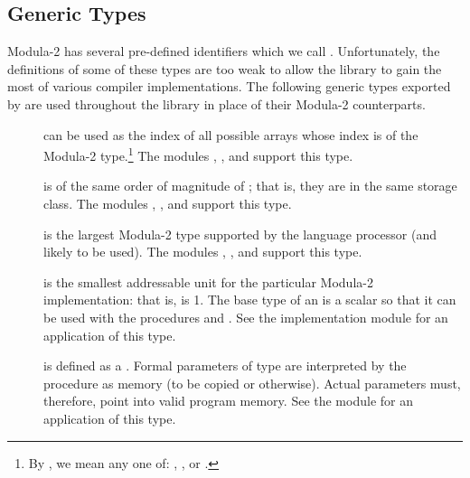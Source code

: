 \subsection{Generic Types}
Modula-2 has several pre-defined identifiers which we call
.  Unfortunately, the definitions of some
of these types are too weak to allow the library to gain the most
of various compiler implementations.
The following generic types exported by 
are used throughout the library in place of their Modula-2 counterparts.
\begin{description}
\item[]
    can be used as the index of all possible arrays whose index
    is of the  Modula-2 type.\footnote{
    	By , we mean any one of:
	, , or .
    }
    The modules , ,
    and  support this type.
\item[]
    is of the same order of magnitude of ; that is,
    they are in the same storage class.
    The modules , ,
    and  support this type.

\item[]
    is the largest Modula-2  type supported by
    the language processor (and likely to be used).
    The modules , ,
    and  support this type.
    
\item[]
    is the smallest addressable unit for the particular Modula-2
    implementation: that is, 
    is 1.  The base type of an
     is a scalar so that it can be used with
    the procedures  and .
    See the implementation module  for an
    application of this type.

\item[]
    is defined as a .
    Formal parameters of type  are interpreted
    by the procedure as memory (to be copied or otherwise).
    Actual parameters must, therefore, point into valid program memory.
    See the module  for an application of this type.
    

\end{description}
